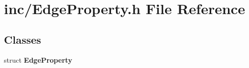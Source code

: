 \section{inc/EdgeProperty.h File Reference}
\label{EdgeProperty_8h}
\subsection*{Classes}
\begin{CompactItemize}
\item 
struct {\bf EdgeProperty}
\end{CompactItemize}
